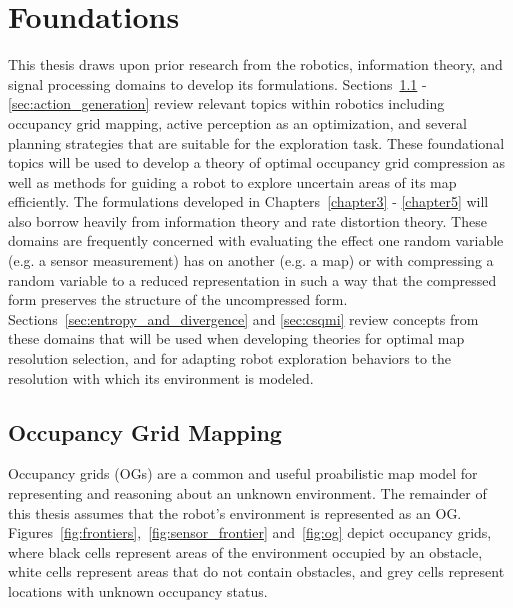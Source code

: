 \chapter{Foundations}
\label{chapter2}

This thesis draws upon prior research from the robotics, information theory, and signal
processing domains to develop its formulations.
Sections~\ref{sec:occ_grid_mapping} - \ref{sec:action_generation} review relevant topics within
robotics including occupancy grid mapping,
active perception as an optimization, and several planning strategies that are suitable for the
exploration task. These foundational topics will be used to develop a theory of
optimal occupancy grid compression as well as methods for guiding a robot to explore
uncertain areas of its map efficiently. The formulations developed in
Chapters~\ref{chapter3} - \ref{chapter5} will also
borrow heavily from information theory and rate distortion theory. These
domains are frequently concerned with evaluating the effect one random
variable (e.g. a sensor measurement) has on
another (e.g. a map) or with compressing a random variable to a reduced
representation in such a way that the compressed form preserves the structure of the
uncompressed form.
Sections~\ref{sec:entropy_and_divergence} and \ref{sec:csqmi} review concepts from
these domains that will be used when developing theories for optimal map resolution selection,
and for adapting robot exploration behaviors to the resolution with which its environment is
modeled.

\section{Occupancy Grid Mapping}
\label{sec:occ_grid_mapping}

Occupancy grids (OGs) are a common and useful proabilistic map model for representing and
reasoning about an unknown environment. The remainder of this
thesis assumes that the robot's environment is represented as an OG.
Figures~\ref{fig:frontiers},~\ref{fig:sensor_frontier} and~\ref{fig:og} depict occupancy grids,
where black cells represent areas of the environment occupied by an obstacle, white cells
represent areas that do not contain obstacles, and grey cells represent
locations with unknown occupancy status.


